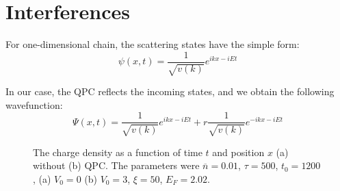 \documentclass[aps,prl,preprint,groupedaddress]{revtex4-1}
\begin{document}
\section{Interferences}
For one-dimensional chain, the scattering states have the simple form:
\begin{equation}
	\psi(x,t) =  \frac{1}{\sqrt{v(k)}} e^{ikx - iEt}
\end{equation}

In our case, the QPC reflects the incoming states, and we obtain the following wavefunction:
\begin{equation}
\Psi(x,t) = \frac{1}{\sqrt{v(k)}} e^{ikx - iEt} + r\frac{1}{\sqrt{v(k)}} e^{-ikx - iEt}
\end{equation}

\begin{figure}[!h]
	\centering
	\qquad
	\caption{The charge density as a function of time $t$ and position $x$ (a) without (b) QPC. The parameters were $\overline{n} =0.01$, $\tau = 500$, $t_0 =1200$, (a) $V_0 = 0$ (b) $V_0 = 3$, $\xi = 50$, $E_F =2.02$.}
	
	\label{fig:density_comp}%
\end{figure}
\end{document}
